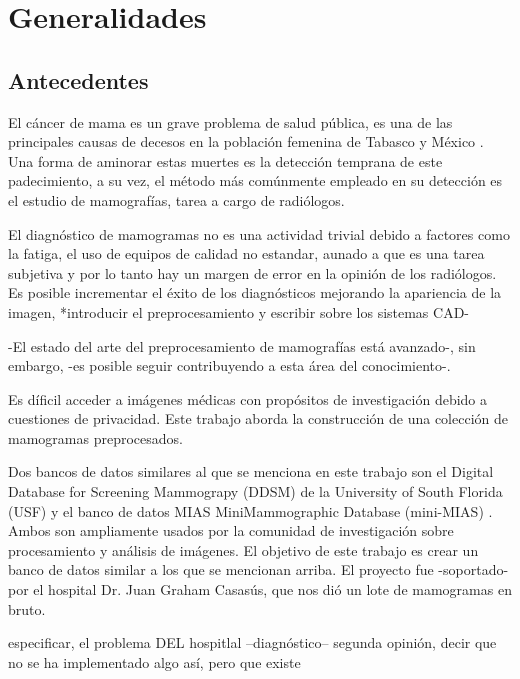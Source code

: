 \chapter{Generalidades}

 \setcounter{page}{1}

\section{Antecedentes}

El cáncer de mama es un grave problema de salud pública, es una de las
principales causas de decesos en la población femenina de Tabasco y México
\cite{inegi, mxcancer}. Una forma de aminorar estas muertes es la detección
temprana de este padecimiento, a su vez, el método más comúnmente empleado en
su detección es el estudio de mamografías, tarea a cargo de radiólogos.

El diagnóstico de mamogramas no es una actividad trivial debido a factores como
la fatiga, el uso de equipos de calidad no estandar, aunado a que es una tarea
subjetiva y por lo tanto hay un margen de error en la opinión de los
radiólogos. Es posible incrementar el éxito de los diagnósticos mejorando la
apariencia de la imagen, *introducir el preprocesamiento y escribir sobre los
sistemas CAD-


-El estado del arte del preprocesamiento de mamografías está avanzado-, sin embargo,
-es posible seguir contribuyendo a esta área del conocimiento-. 

Es díficil acceder a imágenes médicas con propósitos de investigación debido a
cuestiones de privacidad. Este trabajo aborda la construcción de una colección
de mamogramas preprocesados.

Dos bancos de datos similares al que se menciona en este trabajo son el Digital
Database for Screening Mammograpy (DDSM) de la University of South Florida
(USF) \cite{heath2000digital} y el banco de datos MIAS MiniMammographic
Database (mini-MIAS) \cite{sucklingmini}. Ambos son ampliamente usados por la
comunidad de investigación sobre procesamiento y análisis de imágenes. El
objetivo de este trabajo es crear un banco de datos similar a los que se
mencionan arriba. El proyecto fue -soportado- por el hospital Dr. Juan Graham
Casasús, que nos dió un lote de mamogramas en bruto.

especificar, el problema DEL
hospitlal --diagnóstico-- segunda opinión, decir que no se ha implementado algo
así, pero que existe
 
